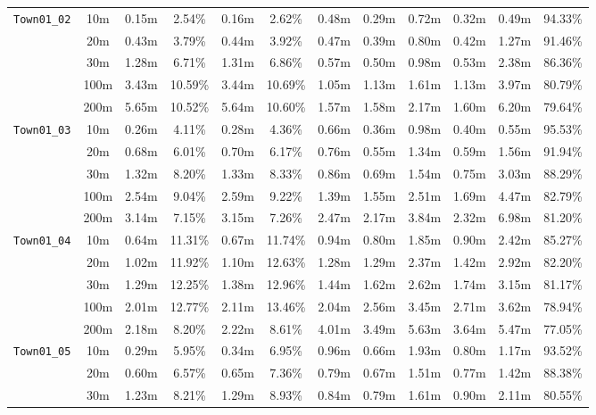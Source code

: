 \begin{table}
{\begin{tabular}{@{}cccccccccccc@{}}
      \midrule
      \multirow{5}{*}{\Verb|Town01_02|} & 10m & 0.15m & 2.54\% & 0.16m & 2.62\% & 0.48m & 0.29m & 0.72m & 0.32m & 0.49m & 94.33\% \\
      & 20m & 0.43m & 3.79\% & 0.44m & 3.92\% & 0.47m & 0.39m & 0.80m & 0.42m & 1.27m & 91.46\% \\
      & 30m & 1.28m & 6.71\% & 1.31m & 6.86\% & 0.57m & 0.50m & 0.98m & 0.53m & 2.38m & 86.36\% \\
      & 100m & 3.43m & 10.59\% & 3.44m & 10.69\% & 1.05m & 1.13m & 1.61m & 1.13m & 3.97m & 80.79\% \\
      & 200m & 5.65m & 10.52\% & 5.64m & 10.60\% & 1.57m & 1.58m & 2.17m & 1.60m & 6.20m & 79.64\% \\
      \midrule
      \multirow{5}{*}{\Verb|Town01_03|} & 10m & 0.26m & 4.11\% & 0.28m & 4.36\% & 0.66m & 0.36m & 0.98m & 0.40m & 0.55m & 95.53\% \\
      & 20m & 0.68m & 6.01\% & 0.70m & 6.17\% & 0.76m & 0.55m & 1.34m & 0.59m & 1.56m & 91.94\% \\
      & 30m & 1.32m & 8.20\% & 1.33m & 8.33\% & 0.86m & 0.69m & 1.54m & 0.75m & 3.03m & 88.29\% \\
      & 100m & 2.54m & 9.04\% & 2.59m & 9.22\% & 1.39m & 1.55m & 2.51m & 1.69m & 4.47m & 82.79\% \\
      & 200m & 3.14m & 7.15\% & 3.15m & 7.26\% & 2.47m & 2.17m & 3.84m & 2.32m & 6.98m & 81.20\% \\
      \midrule
      \multirow{5}{*}{\Verb|Town01_04|} & 10m & 0.64m & 11.31\% & 0.67m & 11.74\% & 0.94m & 0.80m & 1.85m & 0.90m & 2.42m & 85.27\% \\
      & 20m & 1.02m & 11.92\% & 1.10m & 12.63\% & 1.28m & 1.29m & 2.37m & 1.42m & 2.92m & 82.20\% \\
      & 30m & 1.29m & 12.25\% & 1.38m & 12.96\% & 1.44m & 1.62m & 2.62m & 1.74m & 3.15m & 81.17\% \\
      & 100m & 2.01m & 12.77\% & 2.11m & 13.46\% & 2.04m & 2.56m & 3.45m & 2.71m & 3.62m & 78.94\% \\
      & 200m & 2.18m & 8.20\% & 2.22m & 8.61\% & 4.01m & 3.49m & 5.63m & 3.64m & 5.47m & 77.05\% \\
      \midrule
      \multirow{5}{*}{\Verb|Town01_05|} & 10m & 0.29m & 5.95\% & 0.34m & 6.95\% & 0.96m & 0.66m & 1.93m & 0.80m & 1.17m & 93.52\% \\
      & 20m & 0.60m & 6.57\% & 0.65m & 7.36\% & 0.79m & 0.67m & 1.51m & 0.77m & 1.42m & 88.38\% \\
      & 30m & 1.23m & 8.21\% & 1.29m & 8.93\% & 0.84m & 0.79m & 1.61m & 0.90m & 2.11m & 80.55\% \\

\end{tabular}}
\end{table}

